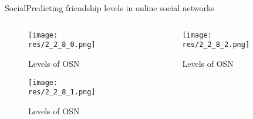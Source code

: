 \begin{frame}{Social}{Predicting friendship levels in online social networks \cite{ahmad_predicting_2010}}

	\begin{columns}
		\begin{column}{0.4\textwidth}
			\begin{center}
			
				\begin{figure}
					\texttt{[image: res/2\_2\_8\_0.png]}
					\caption{\label{fig:2_2_8_0}Levels of OSN}
					
					\texttt{[image: res/2\_2\_8\_1.png]}
					\caption{\label{fig:2_2_8_1}Levels of OSN}
				\end{figure}
				
			\end{center}
		\end{column}
		
		\begin{column}{0.6\textwidth}
		
				\begin{figure}
					\texttt{[image: res/2\_2\_8\_2.png]}
					\caption{\label{fig:2_2_8_2}Levels of OSN}
				\end{figure}
			
		\end{column}
	\end{columns}
	
\end{frame}

